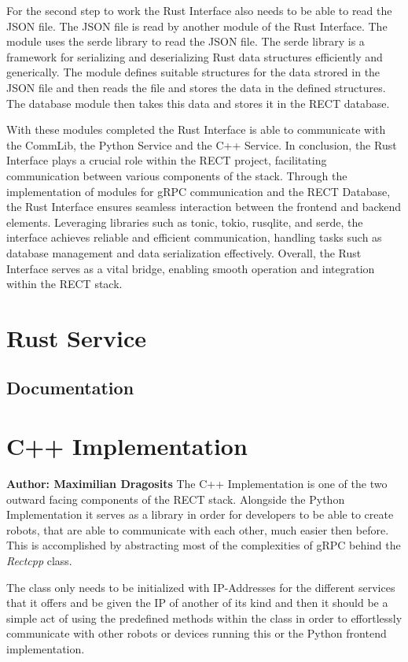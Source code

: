 For the second step to work the Rust Interface also needs to be able to read the JSON file. The JSON file is read by another module of the Rust Interface. The module uses
the serde library to read the JSON file. The serde library is a framework for serializing and deserializing Rust data structures efficiently and generically. The module 
defines suitable structures for the data strored in the JSON file and then reads the file and stores the data in the defined structures. The database module then takes
this data and stores it in the RECT database.\newline

With these modules completed the Rust Interface is able to communicate with the CommLib, the Python Service and the C++ Service. In conclusion, the Rust Interface plays a 
crucial role within the RECT project, facilitating communication between various components of the stack. Through the implementation of modules for gRPC communication and 
the RECT Database, the Rust Interface ensures seamless interaction between the frontend and backend elements. Leveraging libraries such as tonic, tokio, rusqlite, and 
serde, the interface achieves reliable and efficient communication, handling tasks such as database management and data serialization effectively. Overall, the Rust 
Interface serves as a vital bridge, enabling smooth operation and integration within the RECT stack.

\section{Rust Service}
\subsection{Documentation}

\section{C++ Implementation}
\textbf{Author: Maximilian Dragosits}
The C++ Implementation is one of the two outward facing components of the RECT stack. Alongside the Python Implementation 
it serves as a library in order for developers to be able to create robots, that are able to communicate with each other, much
easier then before. This is accomplished by abstracting most of the complexities of gRPC behind the \textit{Rectcpp} class. 

The class only needs to be initialized with IP-Addresses for the different services that it offers and be given the IP of 
another of its kind and then it should be a simple act of using the predefined methods within the class in order to 
effortlessly communicate with other robots or devices running this or the Python frontend implementation.


